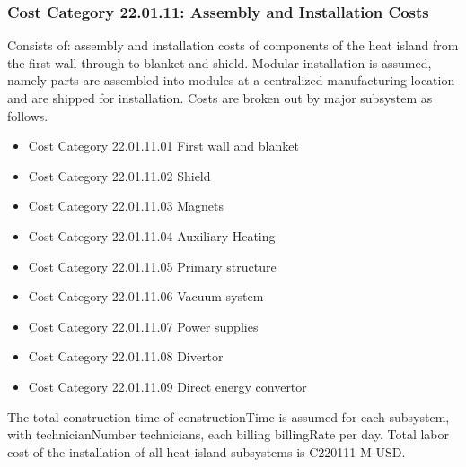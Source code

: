 \subsubsection*{Cost Category 22.01.11: Assembly and Installation Costs}

Consists of: assembly and installation costs of components of the heat island from the first wall through to blanket and shield. Modular installation is assumed, namely parts are assembled into modules at a centralized manufacturing location and are shipped for installation. Costs are broken out by major subsystem as follows.

\begin{itemize}
    \item Cost Category 22.01.11.01 First wall and blanket
    \item Cost Category 22.01.11.02 Shield
    \item Cost Category 22.01.11.03 Magnets
    \item Cost Category 22.01.11.04 Auxiliary Heating
    \item Cost Category 22.01.11.05 Primary structure
    \item Cost Category 22.01.11.06 Vacuum system
    \item Cost Category 22.01.11.07 Power supplies
    \item Cost Category 22.01.11.08 Divertor
    \item Cost Category 22.01.11.09 Direct energy convertor
\end{itemize}

The total construction time of constructionTime is assumed for each subsystem, with technicianNumber technicians, each billing billingRate per day.  Total labor cost of the installation of all heat island subsystems is C220111 M USD.